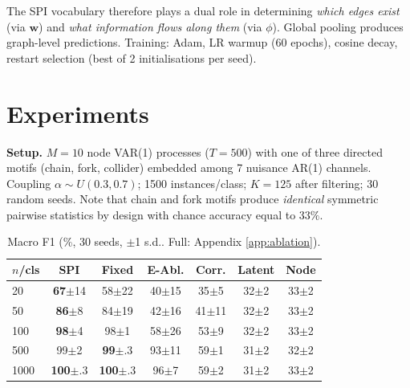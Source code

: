 \documentclass{article}
\begin{document}
The SPI vocabulary therefore plays a dual role in determining \emph{which edges exist} (via $\mathbf{w}$) and \emph{what information flows along them} (via $\phi$). Global pooling produces graph-level predictions. Training: Adam, LR warmup (60 epochs), cosine decay, restart selection (best of 2 initialisations per seed).


\section{Experiments}
\label{sec:experiments}

\textbf{Setup.} $M{=}10$ node VAR(1) processes ($T{=}500$) with one of three directed motifs (chain, fork, collider) embedded among 7 nuisance AR(1) channels. Coupling $\alpha \sim U(0.3, 0.7)$; 1500 instances/class; $K{=}125$ after filtering; 30 random seeds. Note that chain and fork motifs produce \emph{identical} symmetric pairwise statistics by design with chance accuracy equal to $33\%$.
\begin{table}[ht]
\caption{Macro F1 (\%, 30 seeds, $\pm$1 s.d.. Full: Appendix \ref{app:ablation}).}
\label{tab:main}
\vskip 0.05in
\begin{center}
\begin{footnotesize}
\begin{tabular}{lcccccc}
\toprule
$n$/cls & SPI & Fixed & E-Abl. & Corr. & Latent & Node \\
\midrule
20   & \textbf{67}{\scriptsize$\pm$14} & 58{\scriptsize$\pm$22} & 40{\scriptsize$\pm$15}  & 35{\scriptsize$\pm$5}  & 32{\scriptsize$\pm$2} & 33{\scriptsize$\pm$2}  \\
50   & \textbf{86}{\scriptsize$\pm$8}  & 84{\scriptsize$\pm$19} & 42{\scriptsize$\pm$16}  & 41{\scriptsize$\pm$11} & 32{\scriptsize$\pm$2} & 33{\scriptsize$\pm$2}  \\
100  & \textbf{98}{\scriptsize$\pm$4}  & 98{\scriptsize$\pm$1}  & 58{\scriptsize$\pm$26}  & 53{\scriptsize$\pm$9}  & 32{\scriptsize$\pm$2} & 33{\scriptsize$\pm$2}  \\
500  & 99{\scriptsize$\pm$2}  & \textbf{99}{\scriptsize$\pm$.3}& 93{\scriptsize$\pm$11}  & 59{\scriptsize$\pm$1}  & 31{\scriptsize$\pm$2} & 32{\scriptsize$\pm$2}  \\
1000 & \textbf{100}{\scriptsize$\pm$.3}& \textbf{100}{\scriptsize$\pm$.3}& 96{\scriptsize$\pm$7}   & 59{\scriptsize$\pm$2}  & 31{\scriptsize$\pm$2} & 33{\scriptsize$\pm$2}  \\
\bottomrule
\end{tabular}
\end{footnotesize}
\end{center}
\vskip -0.15in
\end{table}
\end{document}
